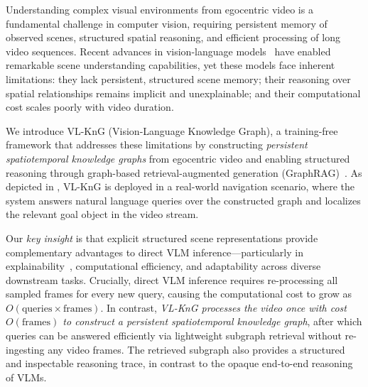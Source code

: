 Understanding complex visual environments from egocentric video is a fundamental challenge in computer vision, requiring persistent memory of observed scenes, structured spatial reasoning, and efficient processing of long video sequences.
Recent advances in vision-language models~\cite{kaduri2025s, liu2025survey, comanici2025gemini, bai2025qwen2} have enabled remarkable scene understanding capabilities, yet these models face inherent limitations: they lack persistent, structured scene memory; their reasoning over spatial relationships remains implicit and unexplainable; and their computational cost scales poorly with video duration.

We introduce VL-KnG (Vision-Language Knowledge Graph), a training-free framework that addresses these limitations by constructing \textit{persistent spatiotemporal knowledge graphs} from egocentric video and enabling structured reasoning through graph-based retrieval-augmented generation (GraphRAG)~\cite{Han2024RetrievalAugmentedGW}.
As depicted in , VL-KnG is deployed in a real-world navigation scenario, where the system answers natural language queries over the constructed graph and localizes the relevant goal object in the video stream.

Our \textit{key insight} is that explicit structured scene representations provide complementary advantages to direct VLM inference—particularly in explainability~\cite{tiddi2022knowledge}, computational efficiency, and adaptability across diverse downstream tasks. 
Crucially, direct VLM inference requires re-processing all sampled frames for every new query, causing the computational cost to grow as $O(\text{queries} \times \text{frames})$. 
In contrast, \textit{VL-KnG processes the video once with cost $O(\text{frames})$ to construct a persistent spatiotemporal knowledge graph}, after which queries can be answered efficiently via lightweight subgraph retrieval without re-ingesting any video frames. 
The retrieved subgraph also provides a structured and inspectable reasoning trace, in contrast to the opaque end-to-end reasoning of VLMs.

